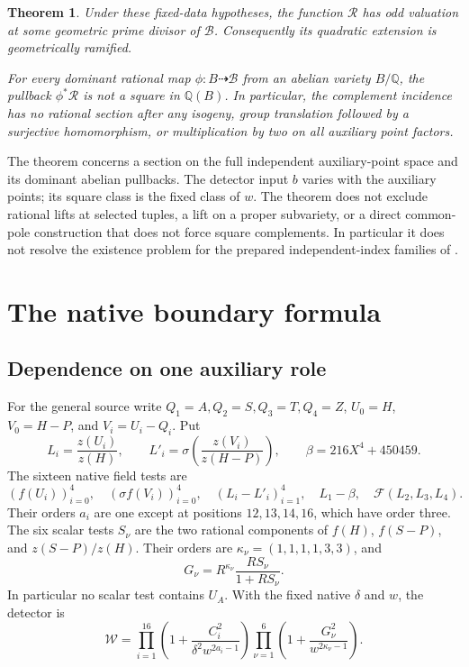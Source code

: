 \documentclass[11pt,a4paper]{article}
\newtheorem{theorem}{Theorem}[section]
\theoremstyle{remark}\newtheorem{remark}[theorem]{Remark}
\newcommand{\Q}{\mathbb Q}\newcommand{\Qbar}{\overline{\mathbb Q}}
\begin{document}
\begin{theorem}\label{thm:main}
Under these fixed-data hypotheses, the function $\mathcal R$ has
odd valuation at some geometric prime divisor of $\mathcal B$.
Consequently its quadratic extension is geometrically ramified.

For every dominant rational map $\phi:B\dashrightarrow\mathcal B$
from an abelian variety $B/\Q$, the pullback $\phi^*\mathcal R$
is not a square in $\Q(B)$. In particular, the complement incidence
has no rational section after any isogeny, group translation followed
by a surjective homomorphism, or multiplication by two on all auxiliary
point factors.
\end{theorem}

The theorem concerns a section on the full independent auxiliary-point
space and its dominant abelian pullbacks. The detector input $b$ varies
with the auxiliary points; its square class is the fixed class of $w$.
The theorem does not
exclude rational lifts at selected tuples, a lift on a proper
subvariety, or a direct common-pole construction that does not force
square complements. In particular it does not resolve the existence
problem for the prepared independent-index families of \cite{Returns}.

\section{The native boundary formula}

\subsection{Dependence on one auxiliary role}

For the general source write $Q_1=A,Q_2=S,Q_3=T,Q_4=Z$,
$U_0=H$, $V_0=H-P$, and $V_i=U_i-Q_i$. Put
\[
 L_i=\frac{z(U_i)}{z(H)},\qquad
 L'_i=\sigma\left(\frac{z(V_i)}{z(H-P)}\right),\qquad
 \beta=216X^4+450459.
\]
The sixteen native field tests are
\begin{equation}\label{eq:generaltests}
 (f(U_i))_{i=0}^4,\quad (\sigma f(V_i))_{i=0}^4,\quad
 (L_i-L'_i)_{i=1}^4,\quad L_1-\beta,\quad
 \mathcal F(L_2,L_3,L_4).
\end{equation}
Their orders $a_i$ are one except at positions $12,13,14,16$,
which have order three. The six scalar tests $S_\nu$ are the two
rational components of $f(H)$, $f(S-P)$, and $z(S-P)/z(H)$.
Their orders are $\kappa_\nu=(1,1,1,1,3,3)$, and
\[
 G_\nu=R^{\kappa_\nu}\frac{RS_\nu}{1+RS_\nu}.
\]
In particular no scalar test contains $U_A$. With the fixed native
$\delta$ and $w$, the detector is
\begin{equation}\label{eq:generalW}
 \mathcal W=
 \prod_{i=1}^{16}\left(1+\frac{C_i^2}{\delta^2w^{2a_i-1}}\right)
 \prod_{\nu=1}^6\left(1+\frac{G_\nu^2}{w^{2\kappa_\nu-1}}\right).
\end{equation}
\end{document}

